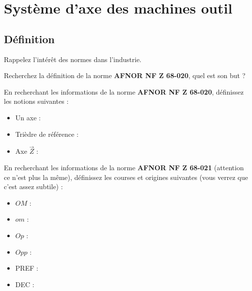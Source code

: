 \documentclass[12pt]{article}
\newcounter{exo}
\newenvironment{exo}{\stepcounter{exo}\vspace{0.5cm}{\bfseries Question \theexo\ :}}{\par\vspace{0.5cm}}
\begin{document}
\section{Système d'axe des machines outil}
\subsection{Définition}

\begin{exo}\label{exo1} Rappelez l'intérêt des normes dans l'industrie.\end{exo}

\newpage

\begin{exo}\label{exo1} Recherchez la définition de la norme \textbf{AFNOR NF Z 68-020}, quel est son but ?\end{exo}


\begin{exo}\label{exo1} En recherchant les informations de la norme \textbf{AFNOR NF Z 68-020}, définissez les notions suivantes :\end{exo}
\begin{itemize}
    \item Un axe :
    \item Trièdre de référence : 
    \item Axe $\overrightarrow{Z}$ :\\
\end{itemize}



\newpage

\begin{exo}\label{exo1} En recherchant les informations de la norme \textbf{AFNOR NF Z 68-021} (attention ce n'est plus la même), définissez les courses et origines suivantes (vous verrez que c'est assez subtile) :\end{exo}
\begin{itemize}
    \item $OM$ :
    \item $om$ :
    \item $Op$ :
    \item $Opp$ :
    \item PREF :
    \item DEC :
\end{itemize}
\end{document}
